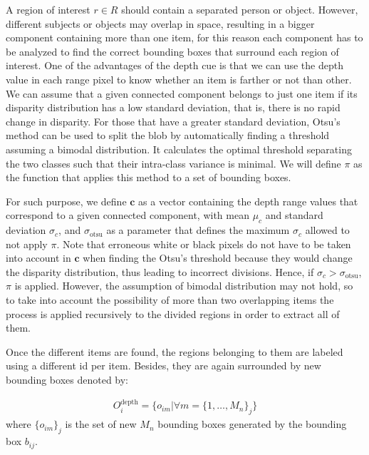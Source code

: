 \documentclass[10pt,twocolumn,letterpaper]{article}
\begin{document}
A region of interest $r \in R$ should contain a separated person or object. However, different subjects or objects may overlap in space, resulting in a bigger component containing more than one item, for this reason each component has to be analyzed to find the correct bounding boxes that surround each region of interest. One of the advantages of the depth cue is that we can use the depth value in each range pixel to know whether an item is farther or not than other. We can assume that a given connected component belongs to just one item if its disparity distribution has a low standard deviation, that is, there is no rapid change in disparity. For those that have a greater standard deviation, Otsu's method \cite{otsu1975threshold} can be used to split the blob by automatically finding a threshold assuming a bimodal distribution. It calculates the optimal threshold separating the two classes such that their intra-class variance is minimal. We will define $\pi$ as the function that applies this method to a set of bounding boxes.

For such purpose, we define $\mathbf{c}$ as a vector containing the depth range values that correspond to a given connected component, with mean $\mu_{c}$ and standard deviation $\sigma_{c}$, and $\sigma_\mathrm{otsu}$ as a parameter that defines the maximum $\sigma_{c}$ allowed to not apply $\pi$. Note that erroneous white or black pixels do not have to be taken into account in $\mathbf{c}$ when finding the Otsu's threshold because they would change the disparity distribution, thus leading to incorrect divisions. Hence, if $\sigma_{c} > \sigma_\mathrm{otsu}$,  $\pi$ is applied. However, the assumption of bimodal distribution may not hold, so to take into account the possibility of more than two overlapping items the process is applied recursively to the divided regions in order to extract all of them. 

Once the different items are found, the regions belonging to them are labeled using a different id per item. Besides, they are again surrounded by new bounding boxes denoted by: 

\begin{gather}
O^\mathrm{depth}_i = \big\{ o_{im} | \forall m = \{1, \ldots, M_n \}_j \big\}
\end{gather}
where $\{o_{im}\}_j$ is the set of new $M_n$ bounding boxes generated by the bounding box $b_{ij}$.
\end{document}
